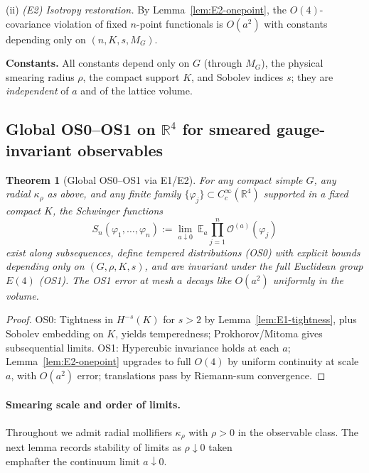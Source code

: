 \documentclass[11pt]{amsart}
\theoremstyle{plain}
\newtheorem{theorem}{Theorem}[section]
\theoremstyle{definition}
\theoremstyle{remark}
\begin{document}
(ii) \emph{(E2) Isotropy restoration.} By Lemma~\ref{lem:E2-onepoint}, the $O(4)$-covariance violation of fixed $n$-point functionals is $O(a^2)$ with constants depending only on $(n,K,s,M_G)$.

\medskip
\noindent\textbf{Constants.} All constants depend only on $G$ (through $M_G$), the physical smearing radius $\rho$, the compact support $K$, and Sobolev indices $s$; they are \emph{independent} of $a$ and of the lattice volume.

\subsection*{Global OS0--OS1 on $\mathbb R^4$ for smeared gauge-invariant observables}
\begin{theorem}[Global OS0--OS1 via E1/E2]\label{thm:global-OS01}
For any compact simple $G$, any radial $\kappa_\rho$ as above, and any finite family $\{\varphi_j\}\subset C_c^\infty(\mathbb R^4)$ supported in a fixed compact $K$, the Schwinger functions
\[
S_n(\varphi_1,\dots,\varphi_n):=\lim_{a\downarrow 0}\ \mathbb E_a\prod_{j=1}^n \mathcal O^{(a)}(\varphi_j)
\]
exist along subsequences, define tempered distributions (OS0) with explicit bounds depending only on $(G,\rho,K,s)$, and are invariant under the full Euclidean group $E(4)$ (OS1). The OS1 error at mesh $a$ decays like $O(a^2)$ uniformly in the volume.
\end{theorem}
\begin{proof}
OS0: Tightness in $H^{-s}(K)$ for $s>2$ by Lemma~\ref{lem:E1-tightness}, plus Sobolev embedding on $K$, yields temperedness; Prokhorov/Mitoma gives subsequential limits. OS1: Hypercubic invariance holds at each $a$; Lemma~\ref{lem:E2-onepoint} upgrades to full $O(4)$ by uniform continuity at scale $a$, with $O(a^2)$ error; translations pass by Riemann-sum convergence.
\end{proof}

\paragraph{Smearing scale and order of limits.} Throughout we admit radial mollifiers $\kappa_\rho$ with $\rho>0$ in the observable class. The next lemma records stability of limits as $\rho\downarrow 0$ taken \\emph{after} the continuum limit $a\downarrow 0$.
\end{document}
